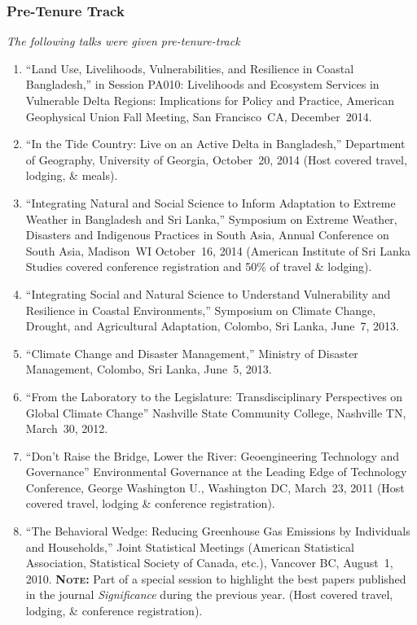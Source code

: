 \subsubsection{Pre-Tenure Track}
\emph{The following talks were given pre-tenure-track}
\begin{enumerate}
\item ``Land Use, Livelihoods, Vulnerabilities, and Resilience in Coastal Bangladesh,'' in Session PA010: Livelihoods and Ecosystem Services in Vulnerable Delta Regions: Implications for Policy and Practice, American Geophysical Union Fall Meeting, San Francisco~CA, December~2014.
\item ``In the Tide Country: Live on an Active Delta in Bangladesh,'' Department of Geography, University of Georgia, October~20, 2014 (Host covered travel, lodging, \& meals).
\item ``Integrating Natural and Social Science to Inform Adaptation to Extreme Weather in Bangladesh and Sri Lanka,'' Symposium on Extreme Weather, Disasters and Indigenous Practices in South Asia, Annual Conference on South Asia, Madison~WI October~16, 2014 (American Institute of Sri Lanka Studies covered conference registration and 50\% of travel \& lodging).
\item ``Integrating Social and Natural Science to Understand Vulnerability and Resilience in Coastal Environments,'' Symposium on Climate Change, Drought, and Agricultural Adaptation, Colombo, Sri Lanka, June~7, 2013.
\item ``Climate Change and Disaster Management,'' Ministry of Disaster Management, Colombo, Sri Lanka, June~5, 2013.
\item ``From the Laboratory to the Legislature: Transdisciplinary Perspectives on Global Climate Change'' Nashville State Community College, Nashville TN, March~30, 2012.
\item ``Don't Raise the Bridge, Lower the River: Geoengineering Technology and Governance'' Environmental Governance at the Leading Edge of Technology Conference, George Washington U., Washington DC, March~23, 2011 (Host covered travel, lodging \& conference registration).
\item ``The Behavioral Wedge: Reducing Greenhouse Gas Emissions by Individuals and Households,'' Joint Statistical Meetings (American Statistical Association, Statistical Society of Canada, etc.), Vancover BC, August~1, 2010. {\bfseries\scshape Note:} Part of a special session to highlight the best papers published in the journal \textit{Significance\/} during the previous year. (Host covered travel, lodging, \& conference registration).

\end{enumerate}
